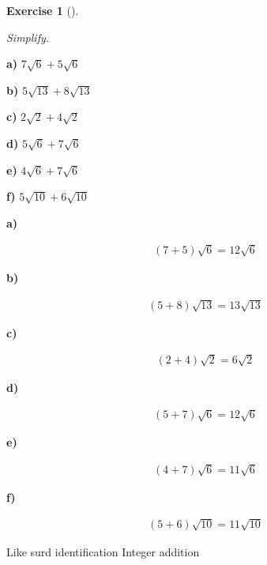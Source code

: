 \documentclass[
  letterpaper,
  DIV=11,
  numbers=noendperiod]{scrreprt}
\theoremstyle{definition}
\newtheorem{exercise}{Exercise}[chapter]
\theoremstyle{remark}
\begin{document}
\begin{exercise}[]\protect\hypertarget{exr-u2-31}{}\label{exr-u2-31}

\emph{Simplify.}

\textbf{a)} \(\displaystyle 7\sqrt{6} + 5\sqrt{6}\)

\textbf{b)} \(\displaystyle 5\sqrt{13} + 8\sqrt{13}\)

\textbf{c)} \(\displaystyle 2\sqrt{2} + 4\sqrt{2}\)

\textbf{d)} \(\displaystyle 5\sqrt{6} + 7\sqrt{6}\)

\textbf{e)} \(\displaystyle 4\sqrt{6} + 7\sqrt{6}\)

\textbf{f)} \(\displaystyle 5\sqrt{10} + 6\sqrt{10}\)

\begin{tcolorbox}[enhanced jigsaw, opacitybacktitle=0.6, coltitle=black, arc=.35mm, colframe=quarto-callout-tip-color-frame, colback=white, bottomrule=.15mm, left=2mm, colbacktitle=quarto-callout-tip-color!10!white, titlerule=0mm, opacityback=0, title=\textcolor{quarto-callout-tip-color}{\faLightbulb}\hspace{0.5em}{🔍 View Solutions}, leftrule=.75mm, breakable, rightrule=.15mm, bottomtitle=1mm, toptitle=1mm, toprule=.15mm]

\textbf{a)}

\[
\begin{aligned}
(7+5)\sqrt{6}=12\sqrt{6}
\end{aligned}
\]

\textbf{b)}

\[
\begin{aligned}
(5+8)\sqrt{13}=13\sqrt{13}
\end{aligned}
\]

\textbf{c)}

\[
\begin{aligned}
(2+4)\sqrt{2}=6\sqrt{2}
\end{aligned}
\]

\textbf{d)}

\[
\begin{aligned}
(5+7)\sqrt{6}=12\sqrt{6}
\end{aligned}
\]

\textbf{e)}

\[
\begin{aligned}
(4+7)\sqrt{6}=11\sqrt{6}
\end{aligned}
\]

\textbf{f)}

\[
\begin{aligned}
(5+6)\sqrt{10}=11\sqrt{10}
\end{aligned}
\]

\end{tcolorbox}

{Like surd identification} {Integer addition}

\end{exercise}
\end{document}
